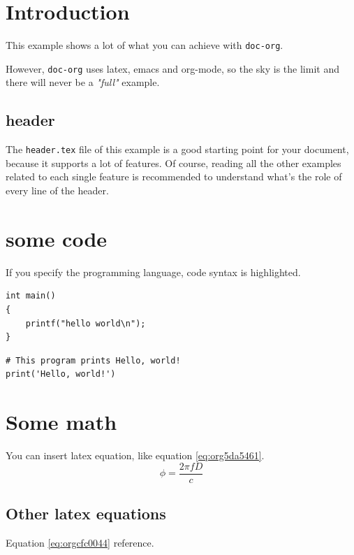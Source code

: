 


\maketitle
\thispagestyle{empty}
\newpage

\tableofcontents
\newpage

\pagestyle{plain}

\section{Introduction}
\label{sec:orge6a1037}
This example shows a lot of what you can achieve with \texttt{doc-org}.

However, \texttt{doc-org} uses latex, emacs and org-mode, so the sky is the limit and
there will never be a \emph{"full"} example.

\subsection{header}
\label{sec:org4bdb7bb}
The \texttt{header.tex} file of this example is a good starting point for your
document, because it supports a lot of features.
Of course, reading all the other examples related to each single feature is
recommended to understand what's the role of every line of the header.
\section{some code}
\label{sec:orgb279d2c}
If you specify the programming language, code syntax is highlighted.
\begin{verbatim}
int main()
{
    printf("hello world\n");
}
\end{verbatim}

\begin{verbatim}
# This program prints Hello, world!
print('Hello, world!')
\end{verbatim}

\section{Some math}
\label{sec:orgcbab23d}
You can insert latex equation, like equation \ref{eq:org5da5461}.
\begin{equation}
\label{eq:org5da5461}
\phi = \frac{2\pi fD}{c}
\end{equation}
\subsection{Other latex equations}
\label{sec:orge394543}
Equation \ref{eq:orgcfc0044} reference.

